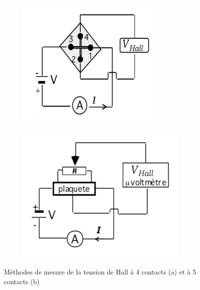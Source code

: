 \begin{minipage}{\textwidth}
    \begin{figure}
        \centering
        \begin{subfigure}{0.25\textwidth}
            \includegraphics[width=\linewidth]{figures/circuit_4branch.png}
            \caption{}
            \label{fig:4branch}
        \end{subfigure}%
        \begin{subfigure}{0.25\textwidth}
            \includegraphics[width=\linewidth]{figures/circuit_5branch.png}
            \caption{}
            \label{fig:5branch}
        \end{subfigure}
        \caption{Méthodes de mesure de la tension de Hall à 4 contacts (a) et à 5 contacts (b) \cite{notice}}
        \label{fig:circuit}
    \end{figure}
    

\end{minipage}
